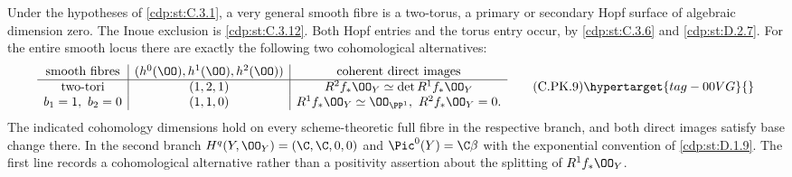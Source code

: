 \begin{proposition}\hypertarget{tag-01F6}{}\label{cdp:st:C.3.11}


Under the hypotheses of \ref{cdp:st:C.3.1}, a very general smooth fibre
is a two-torus, a primary or secondary Hopf surface of
algebraic dimension zero. The Inoue exclusion is \ref{cdp:st:C.3.12}.
Both Hopf
entries and the torus entry occur, by \ref{cdp:st:C.3.6} and \ref{cdp:st:D.2.7}.
For the entire smooth locus there are exactly the following
two cohomological alternatives:
\[
\begin{array}{c|c|c}
\text{smooth fibres}&
 (h^0(\OO),h^1(\OO),h^2(\OO))&
 \text{coherent direct images}\\ \hline
\text{two-tori}&(1,2,1)&
 R^2f_*\OO_Y\simeq\det R^1f_*\OO_Y\\
b_1=1,\ b_2=0&(1,1,0)&
 R^1f_*\OO_Y\simeq\OO_{\PP^1},\
 R^2f_*\OO_Y=0 .
\end{array}
\tag{C.PK.9}\hypertarget{tag-00VG}{}\label{cdp:eq:C.PK.9}
\]
The indicated cohomology dimensions hold on every
scheme-theoretic full fibre in the respective branch,
and both direct images satisfy base change there.
In the second branch
$H^q(Y,\OO_Y)=(\C,\C,0,0)$ and
$\Pic^0(Y)=\C\beta$ with the exponential convention
of \ref{cdp:st:D.1.9}. The first line records a cohomological
alternative rather than a positivity assertion about
the splitting of $R^1f_*\OO_Y$.
\end{proposition}


